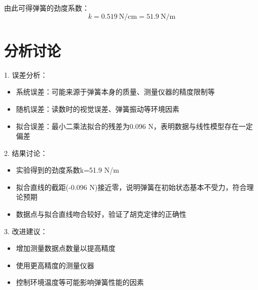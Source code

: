 \documentclass[a4paper,12pt]{article}
\begin{document}
由此可得弹簧的劲度系数：
$$ k = 0.519\ \text{N/cm} = 51.9\ \text{N/m} $$

\section{分析讨论}
1. 误差分析：
\begin{itemize}
    \item 系统误差：可能来源于弹簧本身的质量、测量仪器的精度限制等
    \item 随机误差：读数时的视觉误差、弹簧振动等环境因素
    \item 拟合误差：最小二乘法拟合的残差为0.096 N，表明数据与线性模型存在一定偏差
\end{itemize}

2. 结果讨论：
\begin{itemize}
    \item 实验得到的劲度系数k=51.9 N/m
    \item 拟合直线的截距(-0.096 N)接近零，说明弹簧在初始状态基本不受力，符合理论预期
    \item 数据点与拟合直线吻合较好，验证了胡克定律的正确性
\end{itemize}

3. 改进建议：
\begin{itemize}
    \item 增加测量数据点数量以提高精度
    \item 使用更高精度的测量仪器
    \item 控制环境温度等可能影响弹簧性能的因素
\end{itemize}
\end{document}
